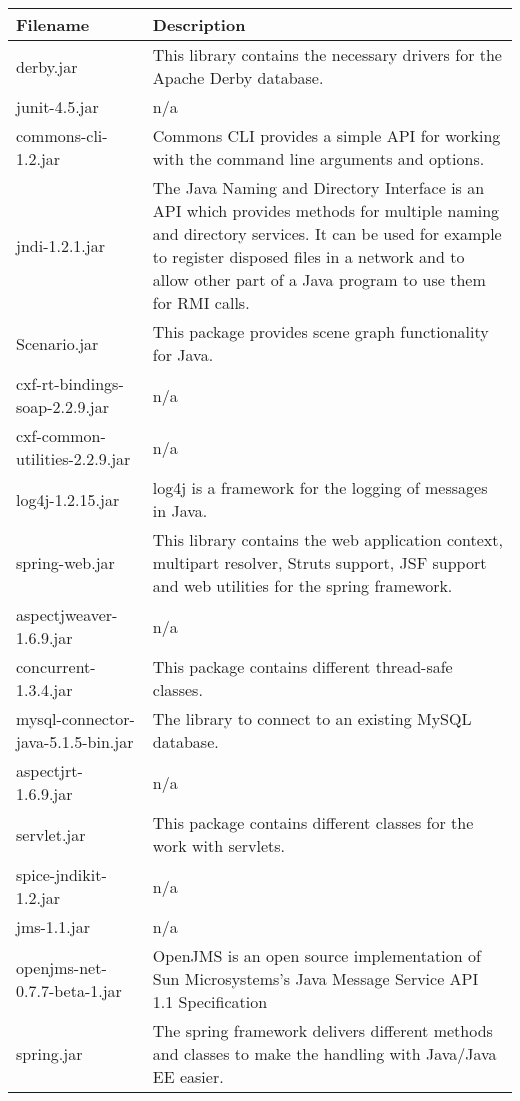 \begin{center}
\begin{longtable}{|p{}|p{}|}
\hline 
Filename & Description\\
\hline
\hline 
derby.jar & This library contains the necessary drivers for the Apache Derby database.\\
\hline 
junit-4.5.jar & n/a\\
\hline 
commons-cli-1.2.jar & Commons CLI provides a simple API for working with the command line arguments and options.\\
\hline 
jndi-1.2.1.jar & The Java Naming and Directory Interface is an API which provides methods for multiple naming and directory services. It can be used for example to register disposed files in a network and to allow other part of a Java program to use them for RMI calls.\\
\hline 
Scenario.jar & This package provides scene graph functionality for Java.\\
\hline 
cxf-rt-bindings-soap-2.2.9.jar & n/a\\
\hline 
cxf-common-utilities-2.2.9.jar & n/a\\
\hline 
log4j-1.2.15.jar & log4j is a framework for the logging of messages in Java.\\
\hline 
spring-web.jar & This library contains the web application context, multipart resolver, Struts support, JSF support and web utilities for the spring framework.\\
\hline 
aspectjweaver-1.6.9.jar & n/a\\
\hline 
concurrent-1.3.4.jar & This package contains different thread-safe classes.\\
\hline 
mysql-connector-java-5.1.5-bin.jar & The library to connect to an existing MySQL database.\\
\hline 
aspectjrt-1.6.9.jar & n/a\\
\hline 
servlet.jar & This package contains different classes for the work with servlets.\\
\hline 
spice-jndikit-1.2.jar & n/a\\
\hline 
jms-1.1.jar & n/a\\
\hline 
openjms-net-0.7.7-beta-1.jar & OpenJMS is an open source implementation of Sun Microsystems's Java Message Service API 1.1 Specification\\
\hline 
spring.jar & The spring framework delivers different methods and classes to make the handling with Java/Java EE easier.\\

\end{longtable}
\end{center}
